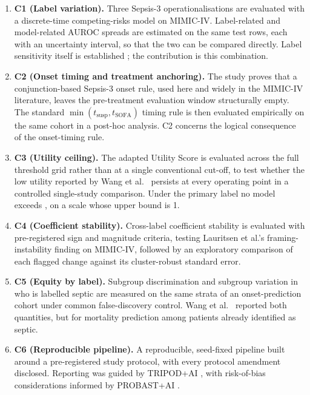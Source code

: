 \begin{enumerate}
    \item \textbf{C1 (Label variation).} Three Sepsis-3 operationalisations are
    evaluated with a discrete-time competing-risks model on MIMIC-IV.
    Label-related and model-related AUROC spreads are estimated on the same test
    rows, each with an uncertainty interval, so that the two can be compared
    directly. Label sensitivity itself is established
    \cite{cohen2024subtle, dutta2026performance}; the contribution is this
    combination.

    \item \textbf{C2 (Onset timing and treatment anchoring).} The study proves
    that a conjunction-based Sepsis-3 onset rule, used here and widely in the
    MIMIC-IV literature, leaves the pre-treatment evaluation window structurally
    empty. The standard $\min(t_{\text{susp}}, t_{\text{SOFA}})$ timing rule is
    then evaluated empirically on the same cohort in a post-hoc analysis. C2
    concerns the logical consequence of the onset-timing rule.

    \item \textbf{C3 (Utility ceiling).} The adapted Utility Score is evaluated
    across the full threshold grid rather than at a single conventional
    cut-off, to test whether the low utility reported by Wang et al.\
    \cite{wang2025srpm} persists at every operating point in a controlled
    single-study comparison. Under the primary label no model exceeds
    \pcUtilityMaxGbtB{}, on a scale whose upper bound is 1.

    \item \textbf{C4 (Coefficient stability).} Cross-label coefficient
    stability is evaluated with pre-registered sign and magnitude criteria,
    testing Lauritsen et al.'s \cite{lauritsen2021framing} framing-instability
    finding on MIMIC-IV, followed by an exploratory comparison of each flagged
    change against its cluster-robust standard error.

    \item \textbf{C5 (Equity by label).} Subgroup discrimination and subgroup
    variation in who is labelled septic are measured on the same strata of an
    onset-prediction cohort under common false-discovery control. Wang et al.\
    \cite{wang2022equity} reported both quantities, but for mortality
    prediction among patients already identified as septic.

    \item \textbf{C6 (Reproducible pipeline).} A reproducible, seed-fixed
    pipeline built around a pre-registered study protocol, with every protocol
    amendment disclosed. Reporting was guided by TRIPOD+AI
    \cite{collins2024tripodai}, with risk-of-bias considerations informed by
    PROBAST+AI \cite{moons2025probastai}.


\end{enumerate}
